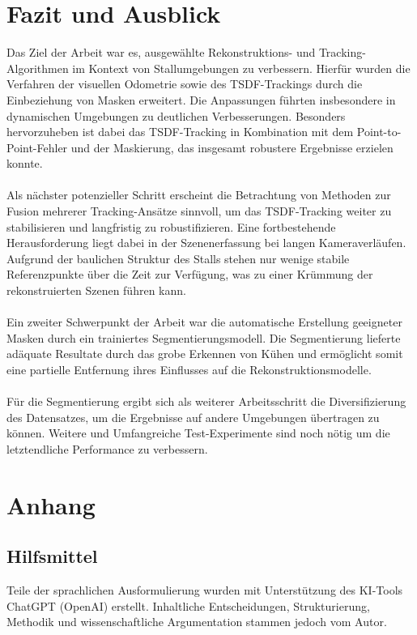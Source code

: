 \documentclass[12pt,DIV=15,BCOR=15mm,twoside,headsepline,abstract=true,listof=totoc,bibliography=totoc]{scrreprt}
\theoremstyle{remark}    %
\begin{document}
    \chapter{Fazit und Ausblick}
    Das Ziel der Arbeit war es, ausgewählte Rekonstruktions- und Tracking-Algorithmen im Kontext von Stallumgebungen zu verbessern.
    Hierfür wurden die Verfahren der visuellen Odometrie sowie des \ac{TSDF}-Trackings durch die Einbeziehung von Masken erweitert.
    Die Anpassungen führten insbesondere in dynamischen Umgebungen zu deutlichen Verbesserungen. Besonders hervorzuheben ist dabei das 
    \ac{TSDF}-Tracking in Kombination mit dem Point-to-Point-Fehler und der Maskierung, das insgesamt robustere Ergebnisse erzielen konnte.\\\\
    Als nächster potenzieller Schritt erscheint die Betrachtung von Methoden zur Fusion mehrerer Tracking-Ansätze sinnvoll, um das \ac{TSDF}-Tracking 
    weiter zu stabilisieren und langfristig zu robustifizieren. Eine fortbestehende Herausforderung liegt dabei in der Szenenerfassung bei langen 
    Kameraverläufen. Aufgrund der baulichen Struktur des Stalls stehen nur wenige stabile Referenzpunkte über die Zeit zur Verfügung, was zu einer 
    Krümmung der rekonstruierten Szenen führen kann.\\\\
    Ein zweiter Schwerpunkt der Arbeit war die automatische Erstellung geeigneter Masken durch ein trainiertes Segmentierungsmodell. Die Segmentierung 
    lieferte adäquate Resultate durch das grobe Erkennen von Kühen und ermöglicht somit eine partielle Entfernung ihres Einflusses auf die 
    Rekonstruktionsmodelle. \\\\
    Für die Segmentierung ergibt sich als weiterer Arbeitsschritt die Diversifizierung des Datensatzes, um die Ergebnisse auf andere Umgebungen übertragen 
    zu können. Weitere und Umfangreiche Test-Experimente sind noch nötig um die letztendliche Performance zu verbessern.

    \clearpage
    \appendix

    \chapter{Anhang}
    \section{Hilfsmittel}
    Teile der sprachlichen Ausformulierung wurden mit Unterstützung des KI-Tools ChatGPT (OpenAI) erstellt. Inhaltliche Entscheidungen, Strukturierung, Methodik
    und wissenschaftliche Argumentation stammen jedoch vom Autor.
\end{document}
